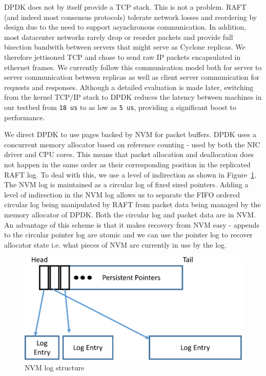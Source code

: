 \documentclass[pageno]{jpaper}
\begin{document}
DPDK does not by itself provide a TCP stack. This is not a problem. RAFT (and
indeed most consensus protocols) tolerate network losses and reordering by
design due to the need to support asynchronous communication. In addition, most
datacenter networks rarely drop or reorder packets and provide full bisection
bandwith between servers that might serve as Cyclone replicas. We therefore
jettisoned TCP and chose to send raw IP packets encapsulated in ethernet
frames. We currently follow this communication model both for server to server
communication between replicas as well as client server communication for
requests and responses. Although a detailed evaluation is made later, switching
from the kernel TCP/IP stack to DPDK reduces the latency between machines in our
testbed from {\tt 18 us} to as low as {\tt 5 us}, providing a significant boost
to performance.

We direct DPDK to use pages backed by NVM for packet buffers. DPDK uses a
concurrent memory allocator based on reference counting - used by both the NIC
driver and CPU cores. This means that packet allocation and deallocation does
not happen in the same order as their corresponding position in the replicated
RAFT log. To deal with this, we use a level of indirection as shown in
Figure~\ref{fig:nvm_log}. The NVM log is maintained as a circular log of fixed
sized pointers. Adding a level of indirection in the NVM log allows us to
separate the FIFO ordered circular log being manipulated by RAFT from packet
data being managed by the memory allocator of DPDK. Both the circular log and
packet data are in NVM. An advantage of this scheme is that it makes recovery
from NVM easy - appends to the circular pointer log are atomic and we can use
the pointer log to recover allocator state i.e. what pieces of NVM are currently
in use by the log.

\begin{figure}
\centering
\includegraphics[scale=0.3]{figures2/nvm_log.pdf}
\caption{NVM log structure}
\label{fig:nvm_log}
\end{figure}
\end{document}
